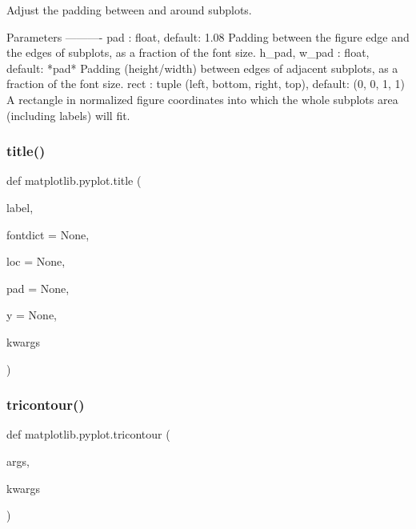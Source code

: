 \begin{DoxyVerb}Adjust the padding between and around subplots.

Parameters
----------
pad : float, default: 1.08
    Padding between the figure edge and the edges of subplots,
    as a fraction of the font size.
h_pad, w_pad : float, default: *pad*
    Padding (height/width) between edges of adjacent subplots,
    as a fraction of the font size.
rect : tuple (left, bottom, right, top), default: (0, 0, 1, 1)
    A rectangle in normalized figure coordinates into which the whole
    subplots area (including labels) will fit.
\end{DoxyVerb}
 \mbox{\label{namespacematplotlib_1_1pyplot_a3b18c849ed31f33936022bdb35ba08e9}} 
\subsubsection{\texorpdfstring{title()}{title()}}
{\footnotesize\ttfamily def matplotlib.\+pyplot.\+title (\begin{DoxyParamCaption}\item[{}]{label,  }\item[{}]{fontdict = {\ttfamily None},  }\item[{}]{loc = {\ttfamily None},  }\item[{}]{pad = {\ttfamily None},  }\item[{}]{y = {\ttfamily None},  }\item[{}]{kwargs }\end{DoxyParamCaption})}

\mbox{\label{namespacematplotlib_1_1pyplot_adcbe2713257f8c76a9aceaacf7f7cd6b}} 
\subsubsection{\texorpdfstring{tricontour()}{tricontour()}}
{\footnotesize\ttfamily def matplotlib.\+pyplot.\+tricontour (\begin{DoxyParamCaption}\item[{}]{args,  }\item[{}]{kwargs }\end{DoxyParamCaption})}

